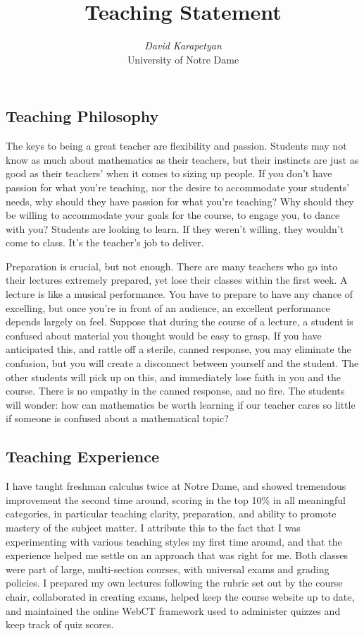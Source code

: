 \documentclass[12pt,oneside]{amsart}
\begin{document}
\title{Teaching Statement}
\author{{\it David Karapetyan}\\
\/ University of Notre Dame}
\date{}
\maketitle
\thispagestyle{empty} %
\pagestyle{empty} %
\subsection{Teaching Philosophy} The keys to being a great teacher are
flexibility and passion. Students may not know as much about mathematics as
their teachers, but their instincts are just as good as their teachers'
when it comes to sizing up people. If you don't have passion for what
you're teaching, nor the desire to accommodate your students' needs, why should
they have passion for what you're teaching?  Why should they be willing to
accommodate your goals for the
course, to engage you, to dance with you? Students are looking to learn. If they
weren't willing, they wouldn't come to class. It's the teacher's job to
deliver.

Preparation is crucial, but not enough. There are many teachers who go into
their lectures extremely prepared, yet lose their classes within the first week.
A lecture is like a musical performance. You have to prepare to have any chance
of excelling, but once you're in front of an audience, an excellent
performance depends largely on feel. Suppose that during the course of a
lecture, a student is confused about material you thought would be easy to
grasp. If you have anticipated this, and rattle off a
sterile, canned response, you may eliminate the confusion, but you will create a
disconnect between yourself and the student. The other students will pick up on
this, and immediately lose faith in you and the course. There is no empathy in
the canned response, and no fire. The students will wonder: how can mathematics
be worth learning if our teacher cares so little if someone is confused about a
mathematical topic?   

\subsection{Teaching Experience} I have taught freshman calculus twice at Notre
Dame, and showed tremendous improvement the second time around, scoring in the
top 10\% in all meaningful categories, in particular teaching clarity,
preparation, and ability to promote mastery of the subject matter. I attribute
this to the fact that I was experimenting with various
teaching styles my first time around, and that the experience helped me settle
on an approach that was right for me. Both classes were part of large,
multi-section courses, with universal exams and grading policies. I prepared my
own lectures following the rubric set out by the course chair, collaborated in
creating exams, helped keep the course website up to date, and maintained the
online WebCT framework used to administer quizzes and keep track of quiz scores.
\end{document}
